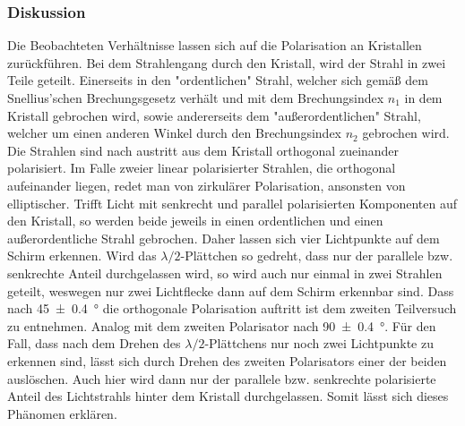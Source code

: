 	\subsubsection*{Diskussion}
	
		Die Beobachteten Verhältnisse lassen sich auf die Polarisation an Kristallen zurückführen.
		Bei dem Strahlengang durch den Kristall, wird der Strahl in zwei Teile geteilt.
		Einerseits in den "ordentlichen" Strahl, welcher sich gemäß dem Snellius'schen Brechungsgesetz verhält und mit dem Brechungsindex $n_1$ in dem Kristall gebrochen wird, sowie andererseits dem "außerordentlichen" Strahl, welcher um einen anderen Winkel durch den Brechungsindex $n_2$ gebrochen wird.
		Die Strahlen sind nach austritt aus dem Kristall orthogonal zueinander polarisiert.
		Im Falle zweier linear polarisierter Strahlen, die orthogonal aufeinander liegen, redet man von zirkulärer Polarisation, ansonsten von elliptischer.
		Trifft Licht mit senkrecht und parallel polarisierten Komponenten auf den Kristall, so werden beide jeweils in einen ordentlichen und einen außerordentliche Strahl gebrochen.
		Daher lassen sich vier Lichtpunkte auf dem Schirm erkennen.
		Wird das $\lambda/2$-Plättchen so gedreht, dass nur der parallele bzw. senkrechte Anteil durchgelassen wird, so wird auch nur einmal in zwei Strahlen geteilt, weswegen nur zwei Lichtflecke dann auf dem Schirm erkennbar sind.
		Dass nach \SI{45+-0,4}{\degree} die orthogonale Polarisation auftritt ist dem zweiten Teilversuch zu entnehmen.
		Analog mit dem zweiten Polarisator nach \SI{90+-0,4}{\degree}.
		Für den Fall, dass nach dem Drehen des $\lambda/2$-Plättchens nur noch zwei Lichtpunkte zu erkennen sind, lässt sich durch Drehen des zweiten Polarisators einer der beiden auslöschen.
		Auch hier wird dann nur der parallele bzw. senkrechte polarisierte Anteil des Lichtstrahls hinter dem Kristall durchgelassen.
		Somit lässt sich dieses Phänomen erklären.